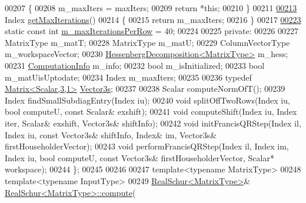 \begin{DoxyCode}
00207     \{
00208       m\_maxIters = maxIters;
00209       \textcolor{keywordflow}{return} *\textcolor{keyword}{this};
00210     \}
00211 
\hyperlink{group___eigenvalues___module_a99453076a9617a6af353b5b1f3220c25}{00213}     Index \hyperlink{group___eigenvalues___module_a99453076a9617a6af353b5b1f3220c25}{getMaxIterations}()
00214     \{
00215       \textcolor{keywordflow}{return} m\_maxIters;
00216     \}
00217 
\hyperlink{group___eigenvalues___module_ab42163ff22cd3ad98aa2bde39b4bbc79}{00223}     \textcolor{keyword}{static} \textcolor{keyword}{const} \textcolor{keywordtype}{int} \hyperlink{group___eigenvalues___module_ab42163ff22cd3ad98aa2bde39b4bbc79}{m\_maxIterationsPerRow} = 40;
00224 
00225   \textcolor{keyword}{private}:
00226     
00227     MatrixType m\_matT;
00228     MatrixType m\_matU;
00229     ColumnVectorType m\_workspaceVector;
00230     \hyperlink{group___eigenvalues___module}{HessenbergDecomposition<MatrixType>} m\_hess;
00231     \hyperlink{group__enums_ga85fad7b87587764e5cf6b513a9e0ee5e}{ComputationInfo} m\_info;
00232     \textcolor{keywordtype}{bool} m\_isInitialized;
00233     \textcolor{keywordtype}{bool} m\_matUisUptodate;
00234     Index m\_maxIters;
00235 
00236     \textcolor{keyword}{typedef} \hyperlink{group___core___module}{Matrix<Scalar,3,1>} \hyperlink{group___core___module}{Vector3s};
00237 
00238     Scalar computeNormOfT();
00239     Index findSmallSubdiagEntry(Index iu);
00240     \textcolor{keywordtype}{void} splitOffTwoRows(Index iu, \textcolor{keywordtype}{bool} computeU, \textcolor{keyword}{const} Scalar& exshift);
00241     \textcolor{keywordtype}{void} computeShift(Index iu, Index iter, Scalar& exshift, Vector3s& shiftInfo);
00242     \textcolor{keywordtype}{void} initFrancisQRStep(Index il, Index iu, \textcolor{keyword}{const} Vector3s& shiftInfo, Index& im, Vector3s& 
      firstHouseholderVector);
00243     \textcolor{keywordtype}{void} performFrancisQRStep(Index il, Index im, Index iu, \textcolor{keywordtype}{bool} computeU, \textcolor{keyword}{const} Vector3s& 
      firstHouseholderVector, Scalar* workspace);
00244 \};
00245 
00246 
00247 \textcolor{keyword}{template}<\textcolor{keyword}{typename} MatrixType>
00248 \textcolor{keyword}{template}<\textcolor{keyword}{typename} InputType>
00249 \hyperlink{group___eigenvalues___module}{RealSchur<MatrixType>}& \hyperlink{group___eigenvalues___module_a60caf9ffad11d728ea458c4dd36d0a98}{RealSchur<MatrixType>::compute}(\textcolor{keyword}{
}
\end{DoxyCode}
